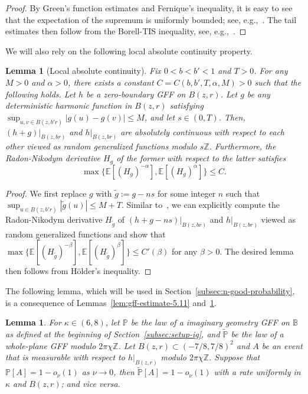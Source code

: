 \documentclass[a4paper]{article}
\numberwithin{equation}{section}
\newtheorem{lemma}[theorem]{Lemma}
\numberwithin{equation}{section}
\renewcommand{\1}{\mathbf{1}}
\begin{document}
\begin{proof}
    By Green's function estimates and Fernique's inequality, it is easy to see that the expectation of the supremum is uniformly bounded; see, e.g.,~\cite[Lemma 2.9]{DingDunlap20}. The tail estimates then follow from the Borell-TIS inequality, see, e.g.,~\cite[Theoerm 2.1.1]{adler-taylor-fields}.
\end{proof}

We will also rely on the following local absolute continuity property.

\begin{lemma}[Local absolute continuity]\label{lem:whole-plane-absolute}
    Fix $0 < b < b' < 1$ and $T>0$. For any $M>0$ and $\alpha>0$, there exists a constant $C = C(b, b', T, \alpha, M)>0$ such that the following holds. Let $h$ be a zero-boundary GFF on $B(z,r)$. Let $g$ be any deterministic harmonic function in $B(z,r)$ satisfying $\sup_{u,v \in B(z,b'r)} |g(u) - g(v)| \leq M$, and let $s \in (0,T)$. Then, $(h+g)|_{B(z, br)}$ and $h|_{B(z,br)}$ are absolutely continuous with respect to each other viewed as random generalized functions modulo $s \mathbb{Z}$. Furthermore, the Radon-Nikodym derivative $H_g$ of the former with respect to the latter satisfies
        $$
        \max\{ \mathbb{E}[(H_g)^{-\alpha}], \mathbb{E}[(H_g)^\alpha] \} \leq C.
        $$
\end{lemma}

\begin{proof}
    We first replace $g$ with $\tilde g:= g - ns$ for some integer $n$ such that $\sup_{u \in B(z,b'r)} |\tilde g(u)| \leq M + T$. Similar to~\cite[Lemma 4.1]{MQ18-geodesic}, we can explicitly compute the Radon-Nikodym derivative $H_{\tilde g}$ of $(h+g - ns)|_{B(z, br)}$ and $h|_{B(z,br)}$ viewed as random generalized functions and show that $\max\{ \mathbb{E}[(H_{\tilde g})^{-\beta}], \mathbb{E}[(H_{\tilde g})^\beta] \} \leq C'(\beta)$ for any $\beta>0$. The desired lemma then follows from H\"older's inequality.
\end{proof}

The following lemma, which will be used in Section~\ref{subsec:n-good-probability}, is a consequence of Lemmas~\ref{lem:gff-estimate-5.11} and~\ref{lem:whole-plane-absolute}.

\begin{lemma}\label{lem:transfer}
    For $\kappa \in (6,8)$, let $\mathbb{P}$ be the law of a imaginary geometry GFF on $\mathbb{B}$ as defined at the beginning of Section~\ref{subsec:setup-ig}, and $\widetilde{\mathbb{P}}$ be the law of a whole-plane GFF modulo $2 \pi \chi \mathbb{Z}$. Let $B(z,r) \subset (-7/8,7/8)^2$ and $A$ be an event that is measurable with respect to $h|_{B(z,r)}$ modulo $2 \pi \chi \mathbb{Z}$. Suppose that $\mathbb P[A]=1-o_\nu(1)$ as $\nu \to 0$, then $\widetilde{\mathbb P}[A]=1-o_\nu(1)$ with a rate uniformly in $\kappa$ and $B(z,r)$; and vice versa.
\end{lemma}
\end{document}
